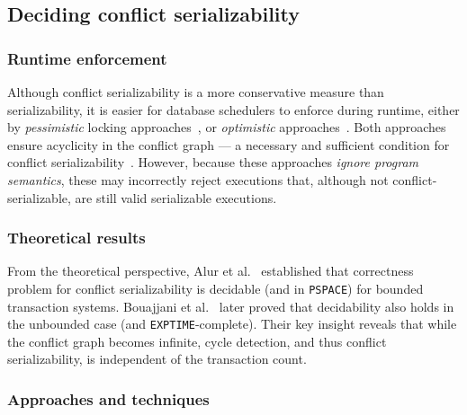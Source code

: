 


\subsection{Deciding conflict serializability}

\subsubsection{Runtime enforcement}
Although conflict serializability is a more conservative measure than 
serializability, it is easier for database schedulers to enforce during 
runtime, either by \textit{pessimistic} locking approaches~\cite{BeHaGo87}, or 
\textit{optimistic} approaches~\cite{KuRo81, BuMo06}.
%
Both approaches ensure acyclicity in the conflict graph --- a necessary and 
sufficient condition for conflict serializability~\cite{SiMa10}. However, 
because these approaches \textit{ignore program semantics}, these may 
incorrectly reject executions that, although not conflict-serializable, are 
still valid serializable executions.
%
%

\subsubsection{Theoretical results}
From the theoretical perspective, Alur et al.~\cite{AlMcPe96} established that 
correctness problem for conflict serializability is decidable (and in 
\texttt{PSPACE}) 
for bounded transaction systems. Bouajjani et al.~\cite{BoEmEnHa13} later 
proved that decidability also holds in the unbounded case (and 
\texttt{EXPTIME}-complete). Their key insight reveals that while the conflict 
graph 
becomes infinite, cycle detection, and thus conflict serializability, is 
independent of the transaction count. 
%
%
\subsubsection{Approaches and techniques}

